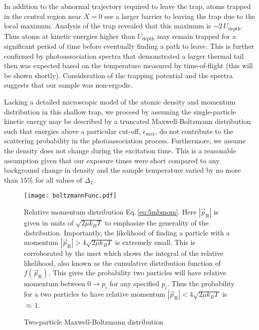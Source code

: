 In addition to the abnormal trajectory required to leave the trap, atoms trapped in the central region near $X=0$ see a larger barrier to leaving the trap due to the local maximum.
Analysis of the trap revealed that this maximum is $\sim 2 \, U_\text{depth}$.
Thus atoms at kinetic energies higher than $U_\text{depth}$ may remain trapped for a significant period of time before eventually finding a path to leave.
This is further confirmed by photoassociation spectra that demonstrated a larger thermal tail then was expected based on the temperature measured by time-of-flight (this will be shown shortly).
Consideration of the trapping potential and the spectra suggests that our sample was non-ergodic.

Lacking a detailed microscopic model of the atomic density and momentum distribution in this shallow trap, we proceed by assuming the single-particle kinetic energy may be described by a truncated Maxwell-Boltzmann distribution such that energies above a particular cut-off, $\epsilon_\text{max}$, do not contribute to the scattering probability in the photoassociation process.
Furthermore, we assume the density does not change during the excitation time.
This is a reasonable assumption given that our exposure times were short compared to any background change in density and the sample temperature varied by no more than $15$\% for all values of $\Delta_2$.
	\begin{figure} 
		\centerline{
		\texttt{[image: boltzmannFunc.pdf]}}
		\caption{Two-particle Maxwell-Boltzmann distribution}{Relative momentum distribution Eq.\,\ref{eq:5mbmom}. Here $|\vec{p}_\text{R}|$ is given in units of $\sqrt{2 \mu k_B T}$ to emphasize the generality of the distribution. Importantly, the likelihood of finding a particle with a momentum $|\vec{p}_\text{R}| > 4\sqrt{2 \mu k_B T}$ is extremely small. This is corroborated by the inset which shows the integral of the relative likelihood, also known as the cumulative distribution function of $f(\vec{p}_\text{R})$. This gives the probability two particles will have relative momentum between $0 \rightarrow p_i$ for any specified $p_i$. Thus the probability for a two particles to have relative momentum $|\vec{p}_\text{R}| < 4\sqrt{2 \mu k_B T}$ is $\approx\,1$.}
		\label{fig:singleBoltz}
	\end{figure}
	
